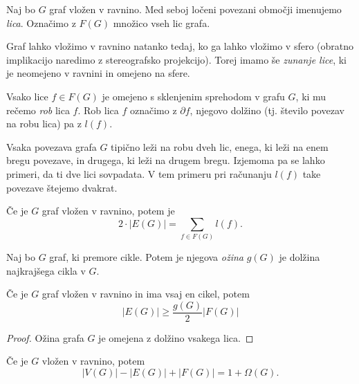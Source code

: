 \begin{definicija}
    Naj bo $G$ graf vložen v ravnino. Med seboj ločeni povezani območji imenujemo \emph{lica}. Označimo z $F(G)$ množico vseh lic grafa.
\end{definicija}

\begin{opomba}
    Graf lahko vložimo v ravnino natanko tedaj, ko ga lahko vložimo v sfero (obratno implikacijo naredimo z stereografsko projekcijo). Torej imamo še \emph{zunanje lice}, ki je neomejeno v ravnini in omejeno na sfere.
\end{opomba}

\begin{definicija}
    Vsako lice $f \in F(G)$ je omejeno s sklenjenim sprehodom v grafu $G$, ki mu rečemo \emph{rob} lica $f$. Rob lica $f$ označimo z $\partial f$, njegovo dolžino (tj. število povezav na robu lica) pa z $l(f)$.
\end{definicija}

\begin{opomba}
    Vsaka povezava grafa $G$ tipično leži na robu dveh lic, enega, ki leži na enem bregu povezave, in drugega, ki leži na drugem bregu. Izjemoma pa se lahko primeri, da ti dve lici sovpadata. V tem primeru pri računanju $l(f)$ take povezave štejemo dvakrat.
\end{opomba}

\begin{trditev}
    Če je $G$ graf vložen v ravnino, potem je $$2 \cdot |E(G)| = \sum_{f \in F(G)} l(f).$$
\end{trditev}

\newpage
\begin{definicija}
    Naj bo $G$ graf, ki premore cikle. Potem je njegova \emph{ožina} $g(G)$ je dolžina najkrajšega cikla v $G$.
\end{definicija}

\begin{trditev}
    Če je $G$ graf vložen v ravnino in ima vsaj en cikel, potem 
    $$|E(G)| \geq \frac{g(G)}{2}|F(G)|$$
\end{trditev}

\begin{proof}
    Ožina grafa $G$ je omejena z dolžino vsakega lica.
\end{proof}

\begin{izrek}
    Če je $G$ vložen v ravnino, potem $$|V(G)| - |E(G)|+|F(G)| = 1 + \Omega (G).$$
\end{izrek}

